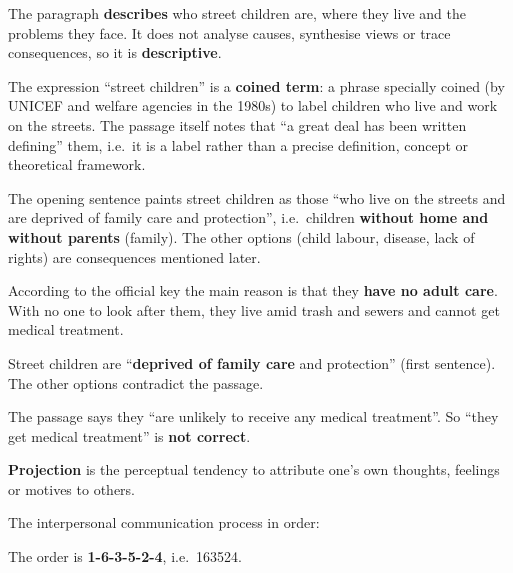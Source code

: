 The paragraph \textbf{describes} who street children are, where they live and the problems they face. It does not analyse causes, synthesise views or trace consequences, so it is \textbf{descriptive}.

The expression ``street children'' is a \textbf{coined term}: a phrase specially coined (by UNICEF and welfare agencies in the 1980s) to label children who live and work on the streets. The passage itself notes that ``a great deal has been written defining'' them, i.e.\ it is a label rather than a precise definition, concept or theoretical framework.

The opening sentence paints street children as those ``who live on the streets and are deprived of family care and protection'', i.e.\ children \textbf{without home and without parents} (family). The other options (child labour, disease, lack of rights) are consequences mentioned later.

According to the official key the main reason is that they \textbf{have no adult care}. With no one to look after them, they live amid trash and sewers and cannot get medical treatment.

Street children are ``\textbf{deprived of family care} and protection'' (first sentence). The other options contradict the passage.

The passage says they ``are unlikely to receive any medical treatment''. So ``they get medical treatment'' is \textbf{not correct}.

\textbf{Projection} is the perceptual tendency to attribute one's own thoughts, feelings or motives to others.

The interpersonal communication process in order:
\begin{center}
\end{center}
The order is \textbf{1-6-3-5-2-4}, i.e.\ 163524.

